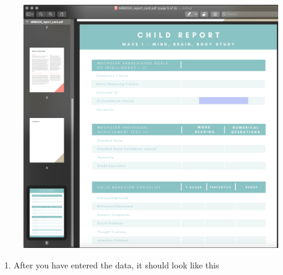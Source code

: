 \documentclass[]{book}
\providecommand{\tightlist}{%
  \setlength{\itemsep}{0pt}\setlength{\parskip}{0pt}}
\begin{document}
\begin{figure}
\centering
\includegraphics{images/final_checklist/report_cards/4.png}
\caption{}
\end{figure}

\begin{enumerate}
\def\labelenumi{\arabic{enumi}.}
\setcounter{enumi}{4}
\tightlist
\item
  After you have entered the data, it should look like this
\end{enumerate}
\end{document}
